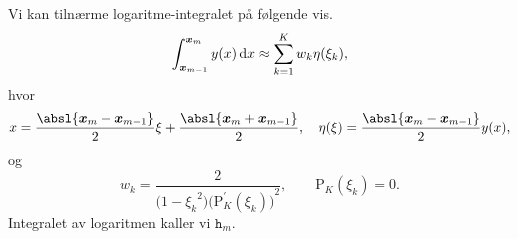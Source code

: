 Vi kan tilnærme logaritme-integralet på følgende vis.
\[
\int_{\bm{x}_{m-1}}^{\bm{x}_m} y(x) \,\mathrm{d} x \approx \sum_{k = 1}^{K} w_k \eta(\xi_k),
\]
hvor
\[
        x = \frac{\absl{\xvec_m - \xvec_{m-1}}}{2}\xi + \frac{\absl{\xvec_m + \xvec_{m-1}}}{2}, \quad \eta(\xi) = \frac{\absl{\xvec_m - \xvec_{m-1}}}{2}y(x),
\]
og
\[
        w_k = \frac{2}{\big( 1 - {\xi_k}^2 \big) {\big( \mathrm{P}_{K}^{\prime} (\xi_k) \big)}^2}, \qquad \mathrm{P}_K(\xi_k) = 0.
\]
Integralet av logaritmen kaller vi $\mathtt{h}_m$.
